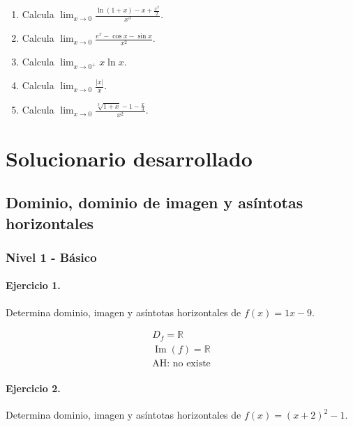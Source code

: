 \documentclass[11pt,a4paper]{article}
\begin{document}
\begin{enumerate}[label=\textbf{E\arabic*.},start=681]
\item Calcula $\displaystyle \lim_{x\to0}\frac{\ln(1+x)-x+\frac{x^2}{2}}{x^3}$.

\item Calcula $\displaystyle \lim_{x\to0}\frac{e^x-\cos x-\sin x}{x^2}$.

\item Calcula $\displaystyle \lim_{x\to0^+}x\ln x$.

\item Calcula $\displaystyle \lim_{x\to0}\frac{|x|}{x}$.

\item Calcula $\displaystyle \lim_{x\to0}\frac{\sqrt[3]{1+x}-1-\frac{x}{3}}{x^2}$.

\end{enumerate}

\newpage

\section{Solucionario desarrollado}

\subsection*{Dominio, dominio de imagen y asíntotas horizontales}


\subsubsection*{Nivel 1 - Básico}

\paragraph{Ejercicio 1.} Determina dominio, imagen y asíntotas horizontales de $f(x)=1x-9$.

\[
\begin{aligned}
D_f=\mathbb{R}\\
\operatorname{Im}(f)=\mathbb{R}\\
\text{{AH: no existe}}
\end{aligned}
\]


\paragraph{Ejercicio 2.} Determina dominio, imagen y asíntotas horizontales de $f(x)=(x+2)^2-1$.
\end{document}
